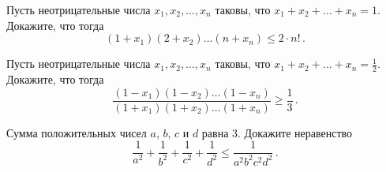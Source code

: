 \begin{problems}
\item
Пусть неотрицательные числа $x_{1}, x_{2}, \ldots, x_{n}$ таковы, что
$x_{1} + x_{2} + \ldots + x_{n} = 1$.
Докажите, что тогда
\[
    (1 + x_{1}) (2 + x_{2}) \ldots (n + x_{n})
\leq
    2 \cdot n!
\, . \]

\item
Пусть неотрицательные числа $x_{1}, x_{2}, \ldots, x_{n}$ таковы, что
$x_{1} + x_{2} + \ldots + x_{n} = \frac{1}{2}$.
Докажите, что тогда
\[
    \frac
        {(1 - x_{1}) (1 - x_{2}) \ldots (1 - x_{n})}
        {(1 + x_{1}) (1 + x_{2}) \ldots (1 + x_{n})}
\geq
    \frac{1}{3}
\, . \]

\item
Сумма положительных чисел $a$, $b$, $c$ и $d$ равна $3$.
Докажите неравенство
\[
    \frac{1}{a^2} + \frac{1}{b^2} + \frac{1}{c^2} + \frac{1}{d^2}
\leq
    \frac{1}{a^2 b^2 c^2 d^2}
\, . \]

\end{problems}

